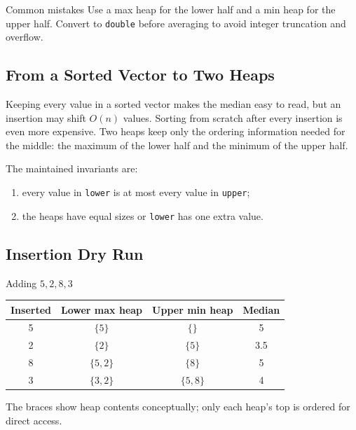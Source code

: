 \begin{revisionbox}{Common mistakes}
Use a max heap for the lower half and a min heap for the upper half. Convert to
\texttt{double} before averaging to avoid integer truncation and overflow.
\end{revisionbox}

\subsection{From a Sorted Vector to Two Heaps}
Keeping every value in a sorted vector makes the median easy to read, but an
insertion may shift \(O(n)\) values. Sorting from scratch after every insertion
is even more expensive. Two heaps keep only the ordering information needed
for the middle: the maximum of the lower half and the minimum of the upper
half.

The maintained invariants are:
\begin{enumerate}
  \item every value in \texttt{lower} is at most every value in
  \texttt{upper};
  \item the heaps have equal sizes or \texttt{lower} has one extra value.
\end{enumerate}

\subsection{Insertion Dry Run}
\begin{dryrunbox}{Adding \(5,2,8,3\)}
\begin{center}
\begin{tabular}{@{}c c c c@{}}
\toprule
Inserted & Lower max heap & Upper min heap & Median \\
\midrule
5 & \(\{5\}\) & \(\{\}\) & 5 \\
2 & \(\{2\}\) & \(\{5\}\) & 3.5 \\
8 & \(\{5,2\}\) & \(\{8\}\) & 5 \\
3 & \(\{3,2\}\) & \(\{5,8\}\) & 4 \\
\bottomrule
\end{tabular}
\end{center}
The braces show heap contents conceptually; only each heap's top is ordered
for direct access.
\end{dryrunbox}

